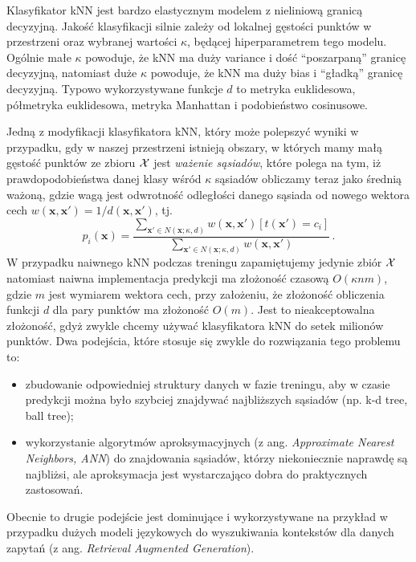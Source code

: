 \documentclass{myclass}
\numberwithin{equation}{subsection}
\begin{document}
Klasyfikator kNN jest bardzo elastycznym modelem z nieliniową granicą decyzyjną. Jakość klasyfikacji
silnie zależy od lokalnej gęstości punktów w przestrzeni oraz wybranej wartości \(\kappa\), będącej
hiperparametrem tego modelu. Ogólnie małe \(\kappa\) powoduje, że kNN ma duży variance i dość
\enquote{poszarpaną} granicę decyzyjną, natomiast duże \(\kappa\) powoduje, że kNN ma duży bias i
\enquote{gładką} granicę decyzyjną. Typowo wykorzystywane funkcje \(d\) to metryka euklidesowa,
półmetryka euklidesowa, metryka Manhattan i podobieństwo cosinusowe.

Jedną z modyfikacji klasyfikatora kNN, który może polepszyć wyniki w przypadku, gdy w naszej
przestrzeni istnieją obszary, w których mamy małą gęstość punktów ze zbioru \(\mathcal{X}\) jest
\emph{ważenie sąsiadów}, które polega na tym, iż prawdopodobieństwa danej klasy wśród \(\kappa\)
sąsiadów obliczamy teraz jako średnią ważoną, gdzie wagą jest odwrotność odległości danego sąsiada
od nowego wektora cech \(w(\bm{x}, \bm{x}') = 1 / d(\bm{x}, \bm{x}')\), tj.
\[
p_i(\bm{x}) = \frac{ \sum_{\bm{x}' \in N(\bm{x}; \kappa, d)} w(\bm{x}, \bm{x}') [t(\bm{x}') = c_i]}{\sum_{\bm{x}' \in N(\bm{x}; \kappa, d)} w(\bm{x}, \bm{x}') }\,.
\]
W przypadku naiwnego kNN podczas treningu zapamiętujemy jedynie zbiór \(\mathcal{X}\) natomiast naiwna
implementacja predykcji ma złożoność czasową \(O(\kappa n m)\), gdzie \(m\) jest wymiarem wektora
cech, przy założeniu, że złożoność obliczenia funkcji \(d\) dla pary punktów ma złożoność \(O(m)\).
Jest to nieakceptowalna złożoność, gdyż zwykle chcemy używać klasyfikatora kNN do setek milionów
punktów. Dwa podejścia, które stosuje się zwykle do rozwiązania tego problemu to: 
\begin{itemize}

    \item zbudowanie odpowiedniej struktury danych w fazie treningu, aby w czasie predykcji można
    było szybciej znajdywać najbliższych sąsiadów (np. k-d tree, ball tree);

    \item wykorzystanie algorytmów aproksymacyjnych (z ang. \textit{Approximate Nearest Neighbors,
    ANN}) do znajdowania sąsiadów, którzy niekoniecznie naprawdę są najbliżsi, ale aproksymacja jest
    wystarczająco dobra do praktycznych zastosowań.

\end{itemize}

Obecnie to drugie podejście jest dominujące i wykorzystywane na przykład w przypadku dużych modeli
językowych do wyszukiwania kontekstów dla danych zapytań (z ang. \textit{Retrieval Augmented
Generation}).
\end{document}
